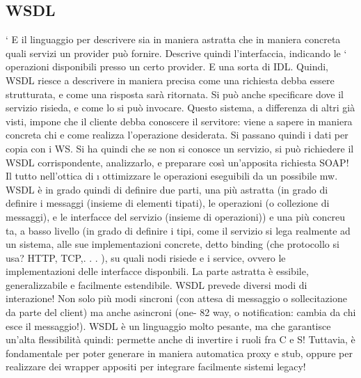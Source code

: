 \subsection{WSDL}
`
E il linguaggio per descrivere sia in maniera astratta che in maniera concreta
quali servizi un provider può fornire. Descrive quindi l'interfaccia, indicando le
`
operazioni disponibili presso un certo provider. E una sorta di IDL. Quindi,
WSDL riesce a descrivere in maniera precisa come una richiesta debba essere
strutturata, e come una risposta sarà ritornata. Si può anche specificare dove il
servizio risieda, e come lo si può invocare.
Questo sistema, a differenza di altri già visti, impone che il cliente debba
conoscere il servitore: viene a sapere in maniera concreta chi e come realizza
l'operazione desiderata. Si passano quindi i dati per copia con i WS. Si ha quindi che se non si conosce un servizio, si
può richiedere il WSDL corrispondente,
analizzarlo, e preparare così un'apposita richiesta SOAP! Il tutto nell'ottica di
\i{}
ottimizzare le operazioni eseguibili da un possibile mw.
WSDL è in grado quindi di definire due parti, una più astratta (in grado
di definire i messaggi (insieme di elementi tipati), le operazioni (o collezione di
messaggi), e le interfacce del servizio (insieme di operazioni)) e una più concreu
ta, a basso livello (in grado di definire i tipi, come il servizio si lega realmente
ad un sistema, alle sue implementazioni concrete, detto binding (che protocollo
si usa? HTTP, TCP,. . . ), su quali nodi risiede e i service, ovvero le implementazioni delle interfacce disponbili. La
parte astratta è essibile, generalizzabile
e facilmente estendibile.
WSDL prevede diversi modi di interazione! Non solo più modi sincroni (con
attesa di messaggio o sollecitazione da parte del client) ma anche asincroni (one-
82
way, o notification: cambia da chi esce il messaggio!).
WSDL è un linguaggio molto pesante, ma che garantisce un'alta flessibilità
quindi: permette anche di invertire i ruoli fra C e S! Tuttavia, è fondamentale
per poter generare in maniera automatica proxy e stub, oppure per realizzare
dei wrapper appositi per integrare facilmente sistemi legacy!
